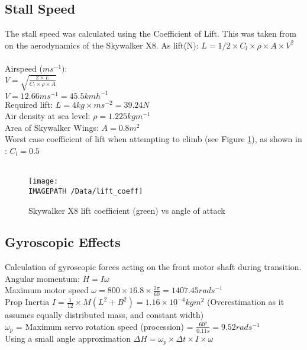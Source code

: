 \subsection{Stall Speed}
\label{sec:stall}
The stall speed was calculated using the Coefficient of Lift. This was taken from \cite{ref:x8aerodynamics} on the aerodynamics of the Skywalker X8.
As lift(N): $L = 1/2\times C_l\times\rho\times A\times V^2$\\\\
Airspeed ($ms^{-1})$:\\
$V= \sqrt{\frac{2\times L}{C_l\times \rho \times A}}$\\
$V = 12.66ms^{-1} = 45.5kmh^{-1}$\\
Required lift: $L = 4kg \times ms^{-2} = 39.24N$\\
Air density at sea level: $\rho = 1.225 kgm^{-1}$\\
Area of Skywalker Wings: $A = 0.8m^2$\\
Worst case coefficient of lift when attempting to climb (see Figure \ref{fig:lift}), as shown in \cite{ref:x8aerodynamics}: $C_l = 0.5$
\\\\
\begin{figure}[!ht]
	\centering
	\texttt{[image: \\IMAGEPATH /Data/lift\_coeff]}
	\caption{Skywalker X8 lift coefficient (green) vs angle of attack}
	\label{fig:lift}
\end{figure}

\subsection{Gyroscopic Effects}
\label{sec:gyro}
Calculation of gyroscopic forces acting on the front motor shaft during transition.\\

Angular momentum: $H = I\omega$\\

Maximum motor speed $\omega = 800\times16.8\times\frac{2\pi}{60} = 1407.45rads^{-1}$\\

Prop Inertia $I = \frac{1}{12}\times M(L^2+B^2) = 1.16\times10^{-4}kgm^2$ (Overestimation as it assumes equally distributed mass, and constant width)\\

$\omega_p$ = Maximum servo rotation speed (procession) = $\frac{60^o}{0.11s} = 9.52rads^{-1}$\\

Using a small angle approximation $\Delta H = \omega_p \times\Delta t \times I \times \omega$\\ 

